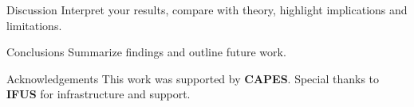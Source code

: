 \documentclass[final]{beamer}
\begin{document}
\begin{frame}[t]
\begin{columns}[t,totalwidth=\textwidth]
\begin{column}{0.48\textwidth}
  \begin{block}{Discussion}
    Interpret your results, compare with theory,
    highlight implications and limitations.
  \end{block}

  \begin{block}{Conclusions}
    Summarize findings and outline future work.
  \end{block}

  \begin{block}{Acknowledgements}
    This work was supported by \textbf{CAPES}.  
    Special thanks to \textbf{IFUS} for infrastructure and support.
  \end{block}
\end{column}

\end{columns}
\end{frame}
\end{document}
